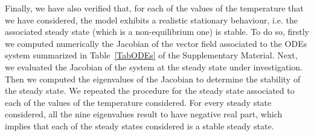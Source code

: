\documentclass[oneside, 10pt, a4paper, twocolumn]{article}
\begin{document}
Finally, we have also verified 
that, for each of the values of the temperature that we have considered, the model exhibits a realistic stationary behaviour, i.e. the associated steady state (which is a non-equilibrium one) is stable. 
To do so, firstly we computed numerically the Jacobian of the vector field associated to the ODEs system summarized in Table~\ref{TabODEs} of the Supplementary Material. 
Next, we evaluated the Jacobian of the system at the steady state 
under investigation.
Then we computed the eigenvalues of the Jacobian to determine the stability of the steady state. 
We repeated the procedure for the steady state associated to each of the values of the temperature considered.
{For every steady state considered, all the nine eigenvalues result to have negative real part, which implies that each of the steady states considered is a stable steady state.}
\end{document}
